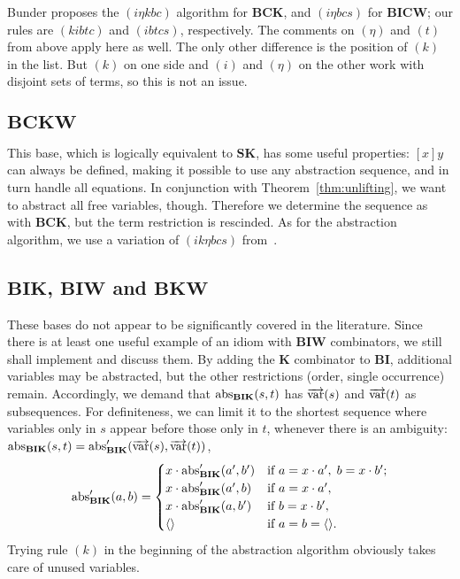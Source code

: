 Bunder proposes the $(i\eta kbc)$ algorithm for $\mathbf{BCK}$, and
$(i\eta bcs)$ for $\mathbf{BICW}$; our rules are $(kibtc)$ and $(ibtcs)$,
respectively.
The comments on $(\eta)$ and $(t)$ from above apply here as well.
The only other difference is the position of $(k)$ in the list.
But $(k)$ on one side and $(i)$ and $(\eta)$ on the other work with disjoint
sets of terms, so this is not an issue.

\subsection*{$\mathbf{BCKW}$}\label{subsec:base-bckw}

This base, which is logically equivalent to $\mathbf{SK}$, has some useful
properties:
$[x]y$ can always be defined, making it possible to use any abstraction
sequence, and in turn handle all equations.
In conjunction with Theorem~\ref{thm:unlifting}, we want to abstract all
free variables, though.
Therefore we determine the sequence as with $\mathbf{BCK}$, but the
term restriction is rescinded.
As for the abstraction algorithm, we use a variation of $(ik\eta bcs)$
from~\cite{curry68}.

\subsection*{$\mathbf{BIK}$, $\mathbf{BIW}$ and $\mathbf{BKW}$}\label{subsec:base-odd}

These bases do not appear to be significantly covered in the literature.
Since there is at least one useful example of an idiom with $\mathbf{BIW}$
combinators, we still shall implement and discuss them.
By adding the $\mathbf{K}$ combinator to $\mathbf{BI}$, additional variables
may be abstracted, but the other restrictions (order, single occurrence) remain.
Accordingly, we demand that $\operatorname{abs}_\mathbf{BIK}(s,t)$ has $\overrightarrow{\operatorname{var}}(s)$ and
$\overrightarrow{\operatorname{var}}(t)$ as subsequences.
For definiteness, we can limit it to the shortest sequence where variables
only in $s$ appear before those only in $t$, whenever there is an ambiguity:
$\operatorname{abs}_\mathbf{BIK}(s,t) = \operatorname{abs}'_\mathbf{BIK}(\overrightarrow{\operatorname{var}}(s), \overrightarrow{\operatorname{var}}(t))$,
\[ \operatorname{abs}'_\mathbf{BIK}(a,b) = \begin{cases}
		x \cdot \operatorname{abs}'_\mathbf{BIK}(a',b') &\text{if } a = x \cdot a', \; b = x \cdot b'; \\
		x \cdot \operatorname{abs}'_\mathbf{BIK}(a',b) &\text{if } a = x \cdot a', \\
		x \cdot \operatorname{abs}'_\mathbf{BIK}(a,b') &\text{if } b = x \cdot b', \\
		\langle \rangle &\text{if } a = b = \langle \rangle. \end{cases} \]
Trying rule $(k)$ in the beginning of the abstraction algorithm obviously takes
care of unused variables.

